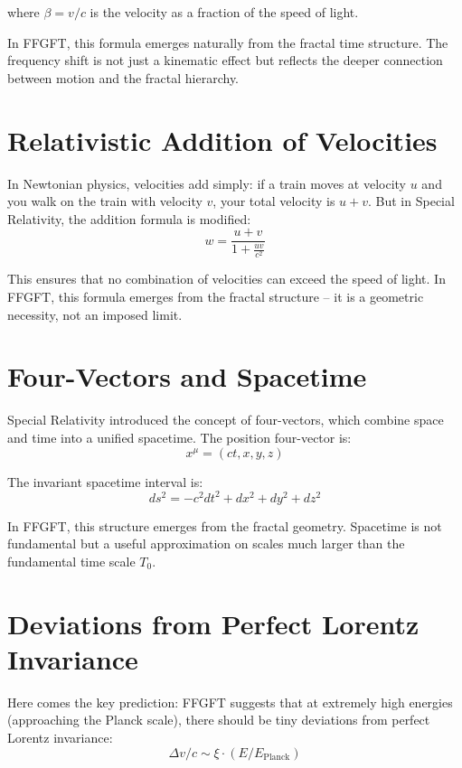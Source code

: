 where $\beta = v/c$ is the velocity as a fraction of the speed of light.

In FFGFT, this formula emerges naturally from the fractal time structure. The frequency shift is not just a kinematic effect but reflects the deeper connection between motion and the fractal hierarchy.

\section{Relativistic Addition of Velocities}

In Newtonian physics, velocities add simply: if a train moves at velocity $u$ and you walk on the train with velocity $v$, your total velocity is $u + v$. But in Special Relativity, the addition formula is modified:
\begin{equation}
w = \frac{u + v}{1 + \frac{uv}{c^2}}
\end{equation}

This ensures that no combination of velocities can exceed the speed of light. In FFGFT, this formula emerges from the fractal structure -- it is a geometric necessity, not an imposed limit.

\section{Four-Vectors and Spacetime}

Special Relativity introduced the concept of four-vectors, which combine space and time into a unified spacetime. The position four-vector is:
\begin{equation}
x^\mu = (ct, x, y, z)
\end{equation}

The invariant spacetime interval is:
\begin{equation}
ds^2 = -c^2dt^2 + dx^2 + dy^2 + dz^2
\end{equation}

In FFGFT, this structure emerges from the fractal geometry. Spacetime is not fundamental but a useful approximation on scales much larger than the fundamental time scale $T_0$.

\section{Deviations from Perfect Lorentz Invariance}

Here comes the key prediction: FFGFT suggests that at extremely high energies (approaching the Planck scale), there should be tiny deviations from perfect Lorentz invariance:
\begin{equation}
\Delta v / c \sim \xi \cdot (E / E_{\text{Planck}})
\end{equation}

